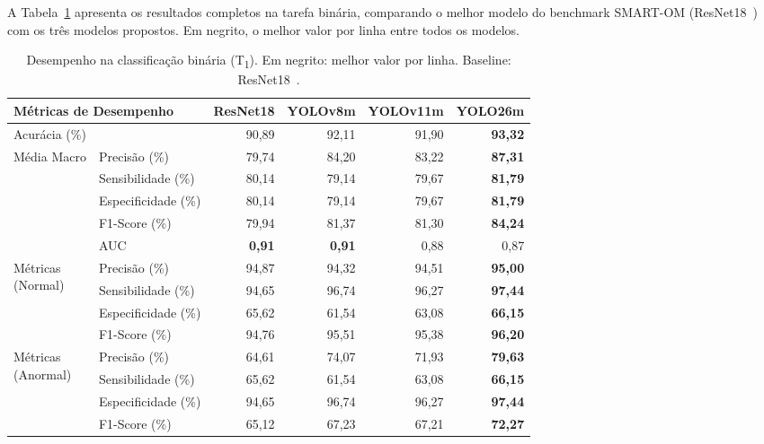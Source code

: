\documentclass[12pt]{article}
\begin{document}
A Tabela~\ref{tab:binary} apresenta os resultados completos na tarefa
binária, comparando o melhor modelo do benchmark SMART-OM
(ResNet18~\cite{smartom}) com os três modelos propostos.
Em negrito, o melhor valor por linha entre todos os modelos.

\begin{table}[htbp]
  \centering
  \caption{Desempenho na classificação binária
           (T\textsubscript{1}). Em negrito: melhor valor por linha.
           Baseline: ResNet18~\cite{smartom}.}
  \label{tab:binary}
  \small
  \begin{tabular}{llrrrr}
    \toprule
    \multicolumn{2}{l}{Métricas de Desempenho}
      & ResNet18 & YOLOv8m & YOLOv11m & YOLO26m \\
    \midrule
    \multicolumn{2}{l}{Acurácia (\%)}
      & 90,89 & 92,11 & 91,90 & \textbf{93,32} \\
    \midrule
    \multirow{5}{*}{Média Macro}
      & Precisão (\%)       & 79,74 & 84,20 & 83,22 & \textbf{87,31} \\
      & Sensibilidade (\%)  & 80,14 & 79,14 & 79,67 & \textbf{81,79} \\
      & Especificidade (\%) & 80,14 & 79,14 & 79,67 & \textbf{81,79} \\
      & F1-Score (\%)       & 79,94 & 81,37 & 81,30 & \textbf{84,24} \\
      & AUC                 & \textbf{0,91} & \textbf{0,91} & 0,88 & 0,87 \\
    \midrule
    \multirow{4}{*}{\parbox{1.6cm}{Métricas\\(Normal)}}
      & Precisão (\%)       & 94,87 & 94,32 & 94,51 & \textbf{95,00} \\
      & Sensibilidade (\%)  & 94,65 & 96,74 & 96,27 & \textbf{97,44} \\
      & Especificidade (\%) & 65,62 & 61,54 & 63,08 & \textbf{66,15} \\
      & F1-Score (\%)       & 94,76 & 95,51 & 95,38 & \textbf{96,20} \\
    \midrule
    \multirow{4}{*}{\parbox{1.6cm}{Métricas\\(Anormal)}}
      & Precisão (\%)       & 64,61 & 74,07 & 71,93 & \textbf{79,63} \\
      & Sensibilidade (\%)  & 65,62 & 61,54 & 63,08 & \textbf{66,15} \\
      & Especificidade (\%) & 94,65 & 96,74 & 96,27 & \textbf{97,44} \\
      & F1-Score (\%)       & 65,12 & 67,23 & 67,21 & \textbf{72,27} \\
    \bottomrule
  \end{tabular}
\end{table}
\end{document}
